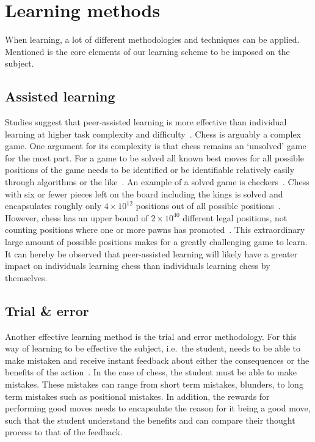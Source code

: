 \section{Learning methods}\label{sec:learning-methods}

When learning, a lot of different methodologies and techniques can be applied.
Mentioned is the core elements of our learning scheme to be imposed on the subject.


\subsection{Assisted learning}\label{subsec:assisted-learning}

Studies suggest that peer-assisted learning is more effective than individual learning at higher task complexity and
difficulty~\cite{carson2023}.
Chess is arguably a complex game.
One argument for its complexity is that chess remains an `unsolved' game for the most part.
For a game to be solved all known best moves for all possible positions of the game needs to be identified or be
identifiable relatively easily through algorithms or the like~\cite{herik2002}.
An example of a solved game is checkers~\cite{schaeffer2007}.
Chess with six or fewer pieces left on the board including the kings is solved and encapsulates roughly only
\( 4 \times 10^{12} \) positions out of all possible positions~\cite{syzygy2024}.
However, chess has an upper bound of \( 2 \times 10^{40} \) different legal positions, not counting positions where one
or more pawns has promoted~\cite{steinerberger2014}.
This extraordinary large amount of possible positions makes for a greatly challenging game to learn.
It can hereby be observed that peer-assisted learning will likely have a greater impact on individuals learning chess
than individuals learning chess by themselves.


\subsection{Trial \& error}\label{subsec:trial-and-error}

Another effective learning method is the trial and error methodology.
For this way of learning to be effective the subject, i.e.\ the student, needs to be able to make mistaken and receive
instant feedback about either the consequences or the benefits of the action~\cite{li2023}.
In the case of chess, the student must be able to make mistakes.
These mistakes can range from short term mistakes, blunders, to long term mistakes such as positional mistakes.
In addition, the rewards for performing good moves needs to encapsulate the reason for it being a good move, such that
the student understand the benefits and can compare their thought process to that of the feedback.
